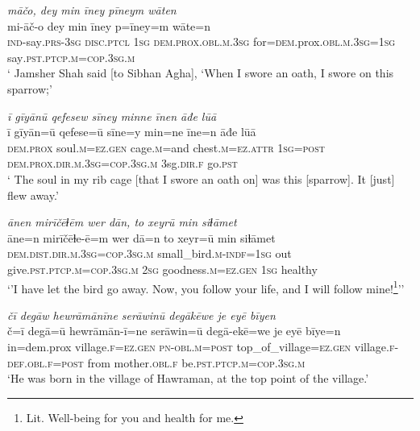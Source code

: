 \ea \label{DP.48}
\textit{māčo, dey min īney pīneym wāten} \\ 
\gll mi-āč-o dey min īney p=īney=m wāte=n \\ 
 \textsc{ind-}say\textsc{.prs}\textsc{-3sg} \textsc{disc.ptcl} \textsc{1sg} \textsc{dem.prox}\textsc{.obl}\textsc{.m}\textsc{.3sg} for\textsc{=dem}.prox\textsc{.obl}\textsc{.m}\textsc{.3sg}\textsc{=1sg} say\textsc{.pst}\textsc{.ptcp}\textsc{.m}\textsc{=cop}\textsc{.3sg}\textsc{.m} \\ 
\glt ` Jamsher Shah said [to Sibhan Agha], ‘When I swore an oath, I swore on this sparrow;'
\z 
 
\ea \label{DP.49}
\textit{ī gīyānū qefesew sīney minne īnen āđe lūā} \\ 
\gll ī gīyān=ū qefese=ū sīne=y min=ne īne=n āđe lūā \\ 
 \textsc{dem.prox} soul\textsc{.m}\textsc{=ez}\textsc{.gen} cage\textsc{.m}=and chest\textsc{.m}\textsc{=ez}.\textsc{attr} \textsc{1sg}\textsc{=\textsc{post}} \textsc{dem.prox}\textsc{.dir}\textsc{.m}\textsc{.3sg}\textsc{=cop}\textsc{.3sg}\textsc{.m} 3sg\textsc{.dir}\textsc{\textsc{.f}} go\textsc{.pst} \\ 
\glt ` The soul in my rib cage [that I swore an oath on] was this [sparrow]. It [just] flew away.'
\z 
 
\ea \label{DP.50}
\textit{ānen mirīčēɫēm wer dān, to xeyrū min siɫāmet} \\ 
\gll āne=n mirīčēɫe-ē=m wer dā=n to xeyr=ū min siɫāmet \\ 
 \textsc{dem.dist}\textsc{.dir}\textsc{.m}\textsc{.3sg}\textsc{=cop}\textsc{.3sg}\textsc{.m} small\_bird\textsc{.m}\textsc{-indf}\textsc{=1sg} out give\textsc{.pst}\textsc{.ptcp}\textsc{.m}\textsc{=cop}\textsc{.3sg}\textsc{.m} \textsc{2sg} goodness\textsc{.m}\textsc{=ez}\textsc{.gen} \textsc{1sg} healthy \\ 
\glt `’I have let the bird go away. Now, you follow your life, and I will follow mine!\footnote{Lit. Well-being for you and health for me.}’'
\z 
 
\ea \label{ZP.3}
\textit{čī degāw hewrāmānīne serāwinū degākēwe je eyē bīyen} \\ 
\gll č=ī degā=ū hewrāmān-ī=ne serāwin=ū degā-ekē=we je eyē bīye=n \\ 
 in=dem.prox village\textsc{.f}\textsc{\textsc{=ez.gen}} \textsc{pn}\textsc{-obl}\textsc{.m}\textsc{=\textsc{post}} top\_of\_village\textsc{\textsc{=ez.gen}} village\textsc{.f}\textsc{-def}\textsc{.obl}\textsc{.f}\textsc{=\textsc{post}} from mother\textsc{.obl}\textsc{.f} be\textsc{.pst}\textsc{.ptcp}\textsc{.m}\textsc{=cop}\textsc{.3sg}\textsc{.m} \\ 
\glt `He was born in the village of Hawraman, at the top point of the village.'
\z 
 
